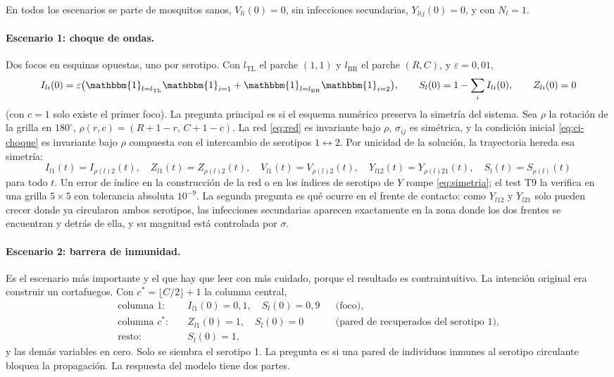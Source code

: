 \documentclass{article}
\numberwithin{equation}{section}
\begin{document}
En todos los escenarios se parte de mosquitos sanos, $V_{li}(0)=0$, sin infecciones secundarias, $Y_{lij}(0)=0$, y con $N_l=1$.

\paragraph{Escenario 1: choque de ondas.} Dos focos en esquinas opuestas, uno por serotipo. Con $l_{\mathrm{TL}}$ el parche $(1,1)$ y $l_{\mathrm{BR}}$ el parche $(R,C)$, y $\varepsilon=0{,}01$,
\begin{equation}\label{eq:ci-choque}
I_{li}(0)=\varepsilon\big(\mathbbm{1}_{l=l_{\mathrm{TL}}}\mathbbm{1}_{i=1}+\mathbbm{1}_{l=l_{\mathrm{BR}}}\mathbbm{1}_{i=2}\big),\qquad
S_l(0)=1-\sum_i I_{li}(0),\qquad Z_{li}(0)=0
\end{equation}
(con $c=1$ solo existe el primer foco). La pregunta principal es si el esquema numérico preserva la simetría del sistema. Sea $\rho$ la rotación de la grilla en $180^\circ$, $\rho(r,c)=(R+1-r,\,C+1-c)$. La red \eqref{eq:red} es invariante bajo $\rho$, $\sigma_{ij}$ es simétrica, y la condición inicial \eqref{eq:ci-choque} es invariante bajo $\rho$ compuesta con el intercambio de serotipos $1\leftrightarrow 2$. Por unicidad de la solución, la trayectoria hereda esa simetría:
\begin{equation}\label{eq:simetria}
I_{l1}(t)=I_{\rho(l)2}(t),\quad Z_{l1}(t)=Z_{\rho(l)2}(t),\quad V_{l1}(t)=V_{\rho(l)2}(t),\quad Y_{l12}(t)=Y_{\rho(l)21}(t),\quad S_l(t)=S_{\rho(l)}(t)
\end{equation}
para todo $t$. Un error de índice en la construcción de la red o en los índices de serotipo de $Y$ rompe \eqref{eq:simetria}; el test T9 la verifica en una grilla $5\times5$ con tolerancia absoluta $10^{-9}$. La segunda pregunta es qué ocurre en el frente de contacto: como $Y_{l12}$ y $Y_{l21}$ solo pueden crecer donde ya circularon ambos serotipos, las infecciones secundarias aparecen exactamente en la zona donde los dos frentes se encuentran y detrás de ella, y su magnitud está controlada por $\sigma$.

\paragraph{Escenario 2: barrera de inmunidad.} Es el escenario más importante y el que hay que leer con más cuidado, porque el resultado es contraintuitivo. La intención original era construir un cortafuegos. Con $c^\ast=\lfloor C/2\rfloor+1$ la columna central,
\begin{equation}\label{eq:ci-barrera}
\begin{aligned}
\text{columna }1:&\quad I_{l1}(0)=0{,}1,\quad S_l(0)=0{,}9 &&\text{(foco)},\\
\text{columna }c^\ast:&\quad Z_{l1}(0)=1,\quad S_l(0)=0 &&\text{(pared de recuperados del serotipo 1)},\\
\text{resto:}&\quad S_l(0)=1,
\end{aligned}
\end{equation}
y las demás variables en cero. Solo se siembra el serotipo 1. La pregunta es si una pared de individuos inmunes al serotipo circulante bloquea la propagación. La respuesta del modelo tiene dos partes.
\end{document}
